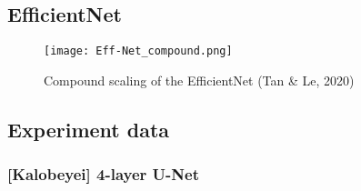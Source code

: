 \documentclass[11pt, a4paper, twoside]{report}
\begin{document}
\subsection{EfficientNet}\label{Eff-Net}

\begin{figure}[H]
  \centering
  \texttt{[image: Eff-Net\_compound.png]}
  \caption{Compound scaling of the EfficientNet (Tan \& Le, 2020)}
  \label{app:EfficientNet}
\end{figure}

\newpage

\subsection{Experiment data}\label{fulldata}

\subsubsection{[Kalobeyei] 4-layer U-Net}
\end{document}
